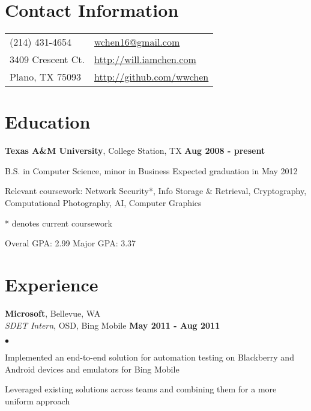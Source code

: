 \documentclass[margin,line]{res}
\newenvironment{list1}{
  \begin{list}{\ding{113}}{%
      \setlength{\itemsep}{0in}
      \setlength{\parsep}{0in} \setlength{\parskip}{0in}
      \setlength{\topsep}{0in} \setlength{\partopsep}{0in} 
      \setlength{\leftmargin}{0.17in}}}{\end{list}}
\newenvironment{list2}{
  \begin{list}{$\bullet$}{%
      \setlength{\itemsep}{0in}
      \setlength{\parsep}{0in} \setlength{\parskip}{0in}
      \setlength{\topsep}{0in} \setlength{\partopsep}{0in} 
      \setlength{\leftmargin}{0.18in}}}{\end{list}}
\begin{document}

\begin{resume}
\section{\sc Contact Information}
\vspace{.05in}
\begin{tabular}{@{}p{3in}p{4in}}
(214) 431-4654             & \href{mailto:wchen16@gmail.com}{wchen16@gmail.com} \\
3409 Crescent Ct.          & \href{http://will.iamchen.com}{http://will.iamchen.com} \\
Plano, TX 75093            & \href{http://github.com/wwchen}{http://github.com/wwchen} \\
                           
\end{tabular}

%
%
\section{\sc Education}
{\bf Texas A\&M University}, College Station, TX \hfill {\bf Aug 2008 - present} \\
\vspace*{-3mm}
\begin{list1}
\item[] \hspace*{-5mm} B.S. in Computer Science, minor in Business \hfill Expected graduation in May 2012 
\item[] \hspace*{-5mm} Relevant coursework: Network Security*, Info Storage \& Retrieval,
 Cryptography, Computational Photography, AI, Computer Graphics
\item[] \hspace*{-5mm} * denotes current coursework
\item[] \hspace*{-5mm} Overal GPA: 2.99 \hspace{5mm} Major GPA: 3.37
\end{list1}


%
%
\section{\sc Experience}
{\bf Microsoft}, Bellevue, WA \\
{\em SDET Intern}, OSD, Bing Mobile \hfill {\bf May 2011 - Aug 2011} \\
\vspace{-3mm}
\begin{list2}
\item Implemented an end-to-end solution for automation testing on Blackberry and Android devices 
  and emulators for Bing Mobile
\item Leveraged existing solutions across teams and combining them for a more uniform approach
\end{list2}


\end{resume}
\end{document}

